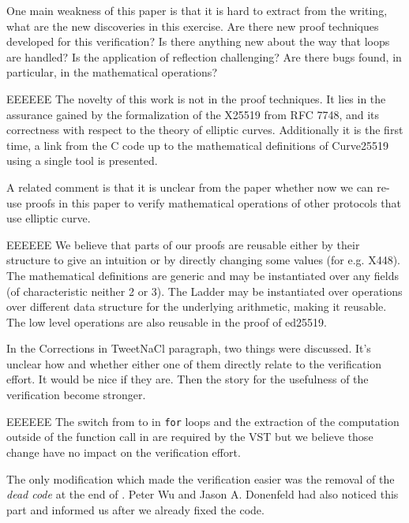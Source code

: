 One main weakness of this paper is that it is hard to extract
from the writing, what are the new discoveries in this
exercise. Are there new proof techniques developed for this
verification? Is there anything new about the way that loops
are handled? Is the application of reflection challenging? Are
there bugs found, in particular, in the mathematical operations?

\begin{answer}{EEEEEE}
The novelty of this work is not in the proof techniques. It
lies in the assurance gained by the formalization of the
X25519 from RFC 7748, and its correctness with respect to
the theory of elliptic curves. Additionally it is the first
time, a link from the C code up to the mathematical definitions of
Curve25519 using a single tool is presented.
\end{answer}

A related comment is that it is unclear from the paper
whether now we can re-use proofs in this paper to verify
mathematical operations of other protocols that use elliptic
curve.

\begin{answer}{EEEEEE}
We believe that parts of our proofs are reusable either by
their structure to give an intuition or by directly changing
some values (for e.g. X448). The mathematical definitions
are generic and may be instantiated over any fields (of characteristic
neither 2 or 3). The Ladder may be instantiated
over operations over different data structure for the underlying
arithmetic, making it reusable. The low level operations
\eg {} are also reusable in the proof of ed25519.
\end{answer}

In the Corrections in TweetNaCl paragraph, two things
were discussed. It’s unclear how and whether either one of
them directly relate to the verification effort. It would be nice
if they are. Then the story for the usefulness of the verification
become stronger.

\begin{answer}{EEEEEE}
The switch from  to  in \texttt{for} loops and the
extraction of the computation outside of the function call in
 are required by the VST but we believe those
change have no impact on the verification effort.

The only modification which made the verification easier
was the removal of the \textit{dead code} at the end of
. Peter Wu and Jason A.
Donenfeld had also noticed this part and informed us after we
already fixed the code.
\end{answer}

